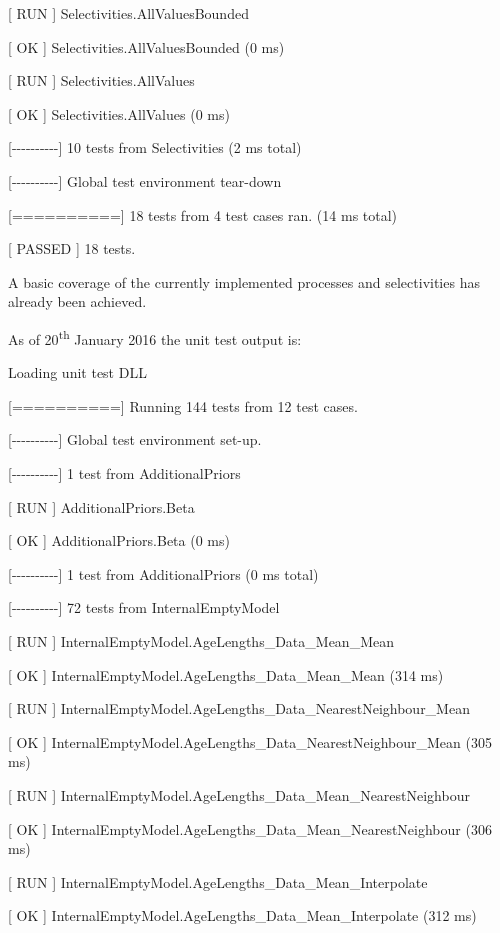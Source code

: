 \documentclass[a4paper,11pt,twoside,pdftex,draft]{article}
\begin{document}
{[} RUN {]} Selectivities.AllValuesBounded

{[} OK {]} Selectivities.AllValuesBounded (0 ms)

{[} RUN {]} Selectivities.AllValues

{[} OK {]} Selectivities.AllValues (0 ms)

{[}-\/-\/-\/-\/-\/-\/-\/-\/-\/-{]} 10 tests from Selectivities (2 ms
total)

{[}-\/-\/-\/-\/-\/-\/-\/-\/-\/-{]} Global test environment tear-down

{[}=========={]} 18 tests from 4 test cases ran. (14 ms total)

{[} PASSED {]} 18 tests.

A basic coverage of the currently implemented processes and
selectivities has already been achieved.

As of 20\textsuperscript{th} January 2016 the unit test output is:

Loading unit test DLL

{[}=========={]} Running 144 tests from 12 test cases.

{[}-\/-\/-\/-\/-\/-\/-\/-\/-\/-{]} Global test environment set-up.

{[}-\/-\/-\/-\/-\/-\/-\/-\/-\/-{]} 1 test from AdditionalPriors

{[} RUN {]} AdditionalPriors.Beta

{[} OK {]} AdditionalPriors.Beta (0 ms)

{[}-\/-\/-\/-\/-\/-\/-\/-\/-\/-{]} 1 test from AdditionalPriors (0 ms
total)

{[}-\/-\/-\/-\/-\/-\/-\/-\/-\/-{]} 72 tests from InternalEmptyModel

{[} RUN {]} InternalEmptyModel.AgeLengths\_Data\_Mean\_Mean

{[} OK {]} InternalEmptyModel.AgeLengths\_Data\_Mean\_Mean (314 ms)

{[} RUN {]} InternalEmptyModel.AgeLengths\_Data\_NearestNeighbour\_Mean

{[} OK {]} InternalEmptyModel.AgeLengths\_Data\_NearestNeighbour\_Mean
(305 ms)

{[} RUN {]} InternalEmptyModel.AgeLengths\_Data\_Mean\_NearestNeighbour

{[} OK {]} InternalEmptyModel.AgeLengths\_Data\_Mean\_NearestNeighbour
(306 ms)

{[} RUN {]} InternalEmptyModel.AgeLengths\_Data\_Mean\_Interpolate

{[} OK {]} InternalEmptyModel.AgeLengths\_Data\_Mean\_Interpolate (312
ms)
\end{document}
